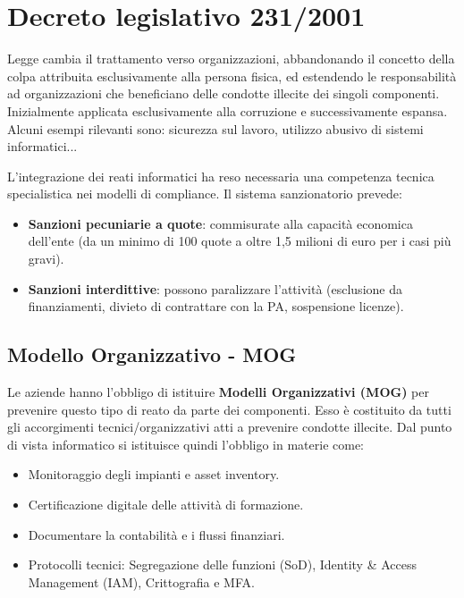 \documentclass[11pt,a4paper]{article}
\begin{document}

\section{Decreto legislativo 231/2001}
Legge cambia il trattamento verso organizzazioni, abbandonando il concetto della colpa attribuita esclusivamente alla persona fisica, ed estendendo le responsabilità ad organizzazioni che beneficiano delle condotte illecite dei singoli componenti.
Inizialmente applicata esclusivamente alla corruzione e successivamente espansa. Alcuni esempi rilevanti sono: sicurezza sul lavoro, utilizzo abusivo di sistemi informatici...

L'integrazione dei reati informatici ha reso necessaria una competenza tecnica specialistica nei modelli di compliance. Il sistema sanzionatorio prevede:
\begin{itemize}
    \item \textbf{Sanzioni pecuniarie a quote}: commisurate alla capacità economica dell'ente (da un minimo di 100 quote a oltre 1,5 milioni di euro per i casi più gravi).
    \item \textbf{Sanzioni interdittive}: possono paralizzare l'attività (esclusione da finanziamenti, divieto di contrattare con la PA, sospensione licenze).
\end{itemize}

\subsection{Modello Organizzativo - MOG}
Le aziende hanno l'obbligo di istituire \textbf{Modelli Organizzativi (MOG)} per prevenire questo tipo di reato da parte dei componenti. Esso è costituito da tutti gli accorgimenti tecnici/organizzativi atti a prevenire condotte illecite.
Dal punto di vista informatico si istituisce quindi l'obbligo in materie come:
\begin{itemize}
    \item Monitoraggio degli impianti e asset inventory.
    \item Certificazione digitale delle attività di formazione.
    \item Documentare la contabilità e i flussi finanziari.
    \item Protocolli tecnici: Segregazione delle funzioni (SoD), Identity \& Access Management (IAM), Crittografia e MFA.
\end{itemize}
\end{document}
